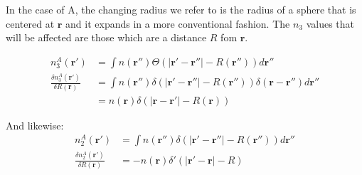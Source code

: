 {  In the case of A, the changing radius we refer to is the radius of a sphere that is centered at $\mathbf{r}$ and it expands in a more conventional fashion.  The $n_3$ values that will be affected are those which are a distance $R$ fom $\mathbf{r}$.

\begin{align}
  n_3^{A}(\mathbf{r}') &= \int n(\mathbf{r}'') \Theta(\left|\mathbf{r}' - \mathbf{r}''\right| -R(\mathbf{r}'')) d\mathbf{r}''\\ 
  \frac{\delta n_3^{A} (\mathbf{r}')}{\delta R(\mathbf{r})} &=
  \int n (\mathbf{r}'') \delta(|\mathbf{r}' - \mathbf{r}''| - R(\mathbf{r}'')) \delta(\mathbf{r}-\mathbf{r}'') d\mathbf{r}'' \\
   &= n (\mathbf{r}) \delta(|\mathbf{r} - \mathbf{r}'| - R(\mathbf{r}))
\end{align}
 
And likewise:
\begin{align}
  n_2^{A}(\mathbf{r}') &= \int n(\mathbf{r}'') \delta(|\mathbf{r}' - \mathbf{r}''| - R(\mathbf{r}'')) d \mathbf{r}''\\
  \frac{\delta n_2^{A}(\mathbf{r}')}{\delta R(\mathbf{r})} &= -n(\mathbf{r}) \delta'(|\mathbf{r}' - \mathbf{r}| - R)\\
 \end{align}

 }
